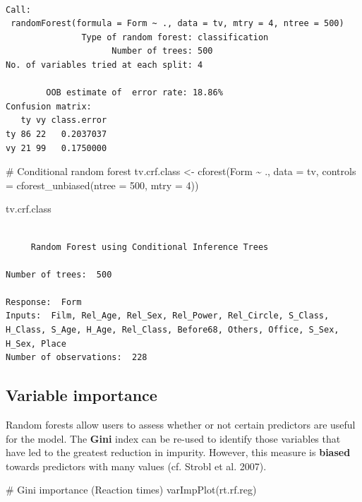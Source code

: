 \documentclass[
  11pt,
  letterpaper,
  DIV=11,
  numbers=noendperiod]{scrreprt}
\newenvironment{Shaded}{\begin{snugshade}}{\end{snugshade}}
\newcommand{\AttributeTok}[1]{\textcolor[rgb]{0.40,0.45,0.13}{#1}}
\newcommand{\CommentTok}[1]{\textcolor[rgb]{0.37,0.37,0.37}{#1}}
\newcommand{\DecValTok}[1]{\textcolor[rgb]{0.68,0.00,0.00}{#1}}
\newcommand{\FunctionTok}[1]{\textcolor[rgb]{0.28,0.35,0.67}{#1}}
\newcommand{\NormalTok}[1]{\textcolor[rgb]{0.00,0.23,0.31}{#1}}
\newcommand{\OtherTok}[1]{\textcolor[rgb]{0.00,0.23,0.31}{#1}}
\newcommand{\SpecialCharTok}[1]{\textcolor[rgb]{0.37,0.37,0.37}{#1}}
\begin{document}
\begin{verbatim}

Call:
 randomForest(formula = Form ~ ., data = tv, mtry = 4, ntree = 500) 
               Type of random forest: classification
                     Number of trees: 500
No. of variables tried at each split: 4

        OOB estimate of  error rate: 18.86%
Confusion matrix:
   ty vy class.error
ty 86 22   0.2037037
vy 21 99   0.1750000
\end{verbatim}

\begin{Shaded}
\begin{Highlighting}[]
\CommentTok{\# Conditional random forest}
\NormalTok{tv.crf.class }\OtherTok{\textless{}{-}} \FunctionTok{cforest}\NormalTok{(Form }\SpecialCharTok{\textasciitilde{}}\NormalTok{ ., }\AttributeTok{data =}\NormalTok{ tv,}
                    \AttributeTok{controls =} \FunctionTok{cforest\_unbiased}\NormalTok{(}\AttributeTok{ntree =} \DecValTok{500}\NormalTok{, }\AttributeTok{mtry =} \DecValTok{4}\NormalTok{))}

\NormalTok{tv.crf.class}
\end{Highlighting}
\end{Shaded}

\begin{verbatim}

     Random Forest using Conditional Inference Trees

Number of trees:  500 

Response:  Form 
Inputs:  Film, Rel_Age, Rel_Sex, Rel_Power, Rel_Circle, S_Class, H_Class, S_Age, H_Age, Rel_Class, Before68, Others, Office, S_Sex, H_Sex, Place 
Number of observations:  228 
\end{verbatim}

\subsection{Variable importance}\label{variable-importance}

Random forests allow users to assess whether or not certain predictors
are useful for the model. The \textbf{Gini} index can be re-used to
identify those variables that have led to the greatest reduction in
impurity. However, this measure is \textbf{biased} towards predictors
with many values (cf. Strobl et al. 2007).

\begin{Shaded}
\begin{Highlighting}[]
\CommentTok{\# Gini importance (Reaction times)}
\FunctionTok{varImpPlot}\NormalTok{(rt.rf.reg)}
\end{Highlighting}
\end{Shaded}
\end{document}
